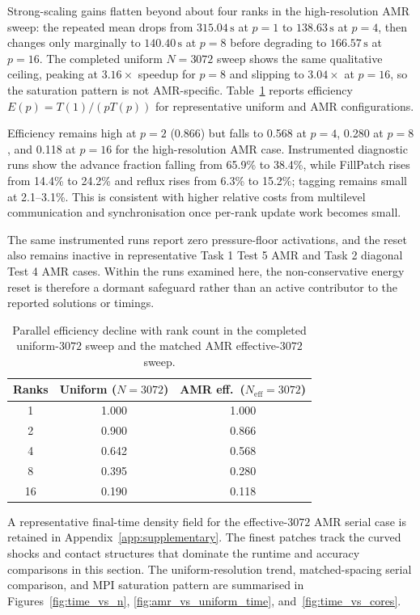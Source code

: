 \documentclass[final,3p,times,twocolumn]{elsarticle}
\newif\ifwithpaths
\DeclareRobustCommand{\pathnote}[1]{\ifwithpaths\textit{ [source: \nolinkurl{#1}]}\fi}
\begin{document}
Strong-scaling gains flatten beyond about four ranks in the high-resolution AMR sweep: the repeated mean drops from $315.04\,\mathrm{s}$ at $p=1$ to $138.63\,\mathrm{s}$ at $p=4$, then changes only marginally to $140.40\,\mathrm{s}$ at $p=8$ before degrading to $166.57\,\mathrm{s}$ at $p=16$. The completed uniform $N=3072$ sweep shows the same qualitative ceiling, peaking at $3.16\times$ speedup for $p=8$ and slipping to $3.04\times$ at $p=16$, so the saturation pattern is not AMR-specific. Table~\ref{tab:efficiency_drop} reports efficiency $E(p)=T(1)/(pT(p))$ for representative uniform and AMR configurations.

Efficiency remains high at $p=2$ (0.866) but falls to 0.568 at $p=4$, 0.280 at $p=8$, and 0.118 at $p=16$ for the high-resolution AMR case. Instrumented diagnostic runs show the advance fraction falling from 65.9\% to 38.4\%, while FillPatch rises from 14.4\% to 24.2\% and reflux rises from 6.3\% to 15.2\%; tagging remains small at 2.1--3.1\%. This is consistent with higher relative costs from multilevel communication and synchronisation once per-rank update work becomes small.

The same instrumented runs report zero pressure-floor activations, and the reset also remains inactive in representative Task 1 Test 5 AMR and Task 2 diagonal Test 4 AMR cases. Within the runs examined here, the non-conservative energy reset is therefore a dormant safeguard rather than an active contributor to the reported solutions or timings.

\begin{table}[!htbp]
\centering
\small
\begin{tabular}{@{}c c c@{}}
\hline
Ranks & Uniform ($N=3072$) & AMR eff.\ ($N_\mathrm{eff}=3072$) \\
\hline
1 & 1.000 & 1.000 \\
2 & 0.900 & 0.866 \\
4 & 0.642 & 0.568 \\
8 & 0.395 & 0.280 \\
16 & 0.190 & 0.118 \\
\hline
\end{tabular}
\caption{Parallel efficiency decline with rank count in the completed uniform-$3072$ sweep and the matched AMR effective-$3072$ sweep.\pathnote{Task3/outputs/report_pack_task3/efficiency.csv}}
\label{tab:efficiency_drop}
\end{table}

A representative final-time density field for the effective-$3072$ AMR serial case is retained in Appendix~\ref{app:supplementary}. The finest patches track the curved shocks and contact structures that dominate the runtime and accuracy comparisons in this section. The uniform-resolution trend, matched-spacing serial comparison, and MPI saturation pattern are summarised in Figures~\ref{fig:time_vs_n}, \ref{fig:amr_vs_uniform_time}, and~\ref{fig:time_vs_cores}.
\end{document}
